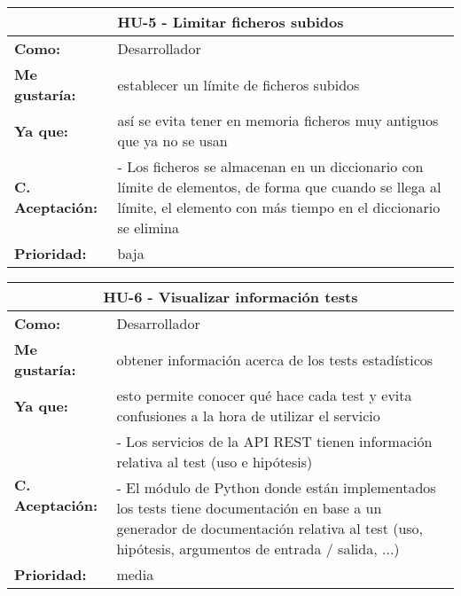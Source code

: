 	

\begin{table}[H]
	\begin{tabular}{| p{3cm}| p{12cm} |}
		\hline
		\multicolumn{2}{|c|}{\textbf{HU-5} - Limitar ficheros subidos} \\ \hline
		\textbf{Como:} & Desarrollador \\ \hline
		\textbf{Me gustaría:} & establecer un límite de ficheros subidos \\ \hline
		\textbf{Ya que:} & así se evita tener en memoria ficheros muy antiguos que ya no se usan \\ \hline
		\textbf{C. Aceptación:} & - Los ficheros se almacenan en un diccionario con límite de elementos, de forma que cuando se llega al límite, el elemento con más tiempo en el diccionario se elimina \\ \hline
		\textbf{\textbf{Prioridad:}} & baja \\ \hline
	\end{tabular}
\end{table}


\begin{table}[H]
	\begin{tabular}{| p{3cm}| p{12cm} |}
		\hline
		\multicolumn{2}{|c|}{\textbf{HU-6} - Visualizar información tests} \\ \hline
		\textbf{Como:} & Desarrollador \\ \hline
		\textbf{Me gustaría:} & obtener información acerca de los tests estadísticos \\ \hline
		\textbf{Ya que:} & esto permite conocer qué hace cada test y evita confusiones a la hora de utilizar el servicio \\ \hline
		\multirow{2}{12cm}{\textbf{C. Aceptación:}} & - Los servicios de la API REST tienen información relativa al test (uso e hipótesis) \\
		& - El módulo de Python donde están implementados los tests tiene documentación en base a un generador de documentación relativa al test (uso, hipótesis, argumentos de entrada / salida, ...) \\ \hline 
		\textbf{\textbf{Prioridad:}} & media \\ \hline
	\end{tabular}
\end{table}



